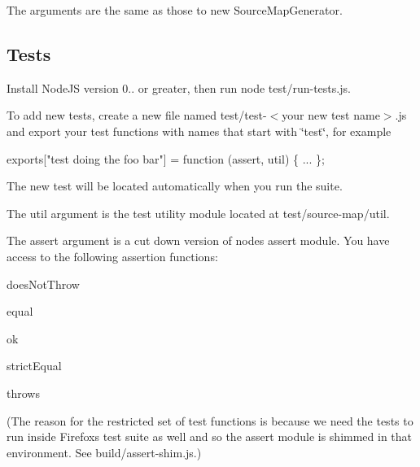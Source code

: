 The arguments are the same as those to {\ttfamily new Source\+Map\+Generator}.

\subsection*{Tests}

\href{https://travis-ci.org/mozilla/source-map}{\tt }

Install Node\+JS version 0.. or greater, then run {\ttfamily node test/run-\/tests.\+js}.

To add new tests, create a new file named {\ttfamily test/test-\/$<$your new test name$>$.js} and export your test functions with names that start with \char`\"{}test\char`\"{}, for example


\begin{DoxyCode}
exports["test doing the foo bar"] = function (assert, util) \{
  ...
\};
\end{DoxyCode}


The new test will be located automatically when you run the suite.

The {\ttfamily util} argument is the test utility module located at {\ttfamily test/source-\/map/util}.

The {\ttfamily assert} argument is a cut down version of node\textquotesingle{}s assert module. You have access to the following assertion functions\+:


\begin{DoxyItemize}
\item {\ttfamily does\+Not\+Throw}
\item {\ttfamily equal}
\item {\ttfamily ok}
\item {\ttfamily strict\+Equal}
\item {\ttfamily throws}
\end{DoxyItemize}

(The reason for the restricted set of test functions is because we need the tests to run inside Firefox\textquotesingle{}s test suite as well and so the assert module is shimmed in that environment. See {\ttfamily build/assert-\/shim.\+js}.) 